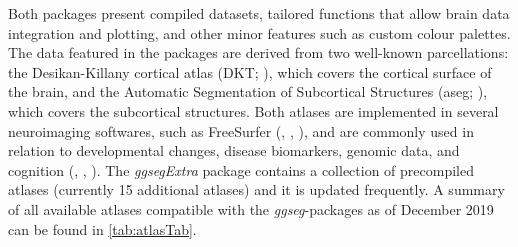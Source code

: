 \documentclass[fleqn,10pt]{wlpeerj} %
\begin{document}
Both packages present compiled datasets, tailored functions that allow brain data integration and plotting, and other minor features such as custom colour palettes.
The data featured in the packages are derived from two well-known parcellations: the Desikan-Killany cortical atlas (DKT; \citet{dkt}), which covers the cortical surface of the brain, and the Automatic Segmentation of Subcortical Structures (aseg; \citet{aseg}), which covers the subcortical structures.
Both atlases are implemented in several neuroimaging softwares, such as FreeSurfer (\citet{fischl_99}, \citet{dale_99}, \citet{Fischl2000}), and are commonly used in relation to developmental changes, disease biomarkers, genomic data, and cognition (\citet{amlien_elaboration_2019}, \citet{WALHOVD20051261}, \citet{Pizzagalli}).
The \emph{ggsegExtra} package contains a collection of precompiled atlases (currently 15 additional atlases) and it is updated frequently.
A summary of all available atlases compatible with the \emph{ggseg}-packages as of December 2019 can be found in \ref{tab:atlasTab}.
\end{document}
